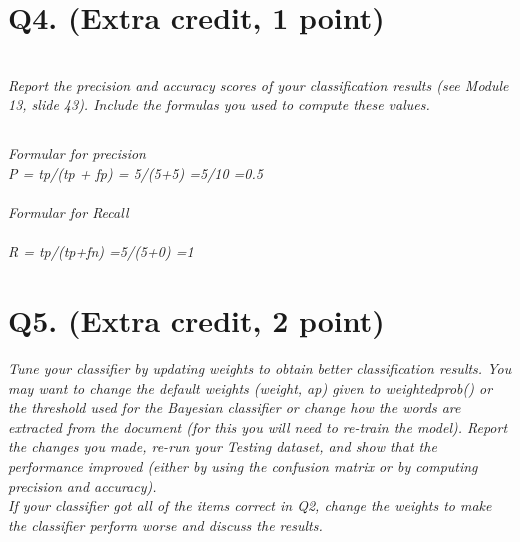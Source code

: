 \documentclass[12pt]{article}
\begin{document}
\section*{Q4. (Extra credit, 1 point)}
\emph{\\
Report the precision and accuracy scores of your classification results (see Module 13, slide 43). Include the formulas you used to compute these values.}
\subsection*{\color{blue}{Answer}}
\emph{Formular for precision\\ P = tp/(tp + fp) = 5/(5+5) =5/10 =0.5\\ \\Formular for Recall\\ \\  R = tp/(tp+fn) =5/(5+0) =1}


\section*{Q5.  (Extra credit, 2 point)}
\emph{Tune your classifier by updating weights to obtain better classification results. You may want to change the default weights (weight, ap) given to weightedprob() or the threshold used for the Bayesian classifier or change how the words are extracted from the document (for this you will need to re-train the model). Report the changes you made, re-run your Testing dataset, and show that the performance improved (either by using the confusion matrix or by computing precision and accuracy).\\ 
If your classifier got all of the items correct in Q2, change the weights to make the classifier perform worse and discuss the results.}
\subsection*{\color{blue}{Answer}}

\end{document}

